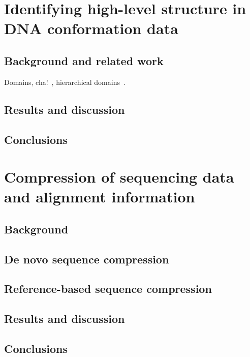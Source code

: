 \documentclass[12pt]{cmuthesis}
\begin{document}
\chapter{Identifying high-level structure in DNA conformation data}

\section{Background and related work}

Domains, cha!~\cite{Filippova2013}, hierarchical domains~\cite{ArmatusAMB}.

\section{Results and discussion}

\section{Conclusions}


\chapter{Compression of sequencing data and alignment information}

\section{Background}

\section{De novo sequence compression}

\section{Reference-based sequence compression}

\section{Results and discussion}

\section{Conclusions}
\end{document}
